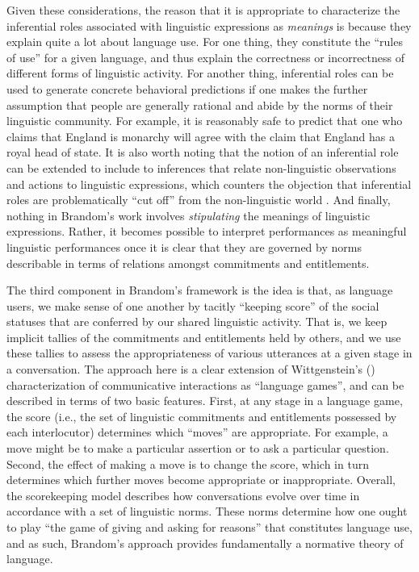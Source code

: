 Given these considerations, the reason that it is appropriate to characterize the inferential roles associated with linguistic expressions as \textit{meanings} is because they explain quite a lot about language use. For one thing, they constitute the ``rules of use'' for a given language, and thus explain the correctness or incorrectness of different forms of linguistic activity. For another thing, inferential roles can be used to generate concrete behavioral predictions if one makes the further assumption that people are generally rational and abide by the norms of their linguistic community. For example, it is reasonably safe to predict that one who claims that England is monarchy will agree with the claim that England has a royal head of state. It is also worth noting that the notion of an inferential role can be extended to include to inferences that relate non-linguistic observations and actions to linguistic expressions, which counters the objection that inferential roles are problematically ``cut off'' from the non-linguistic world \citep[see][pp. 199-271]{Brandom:1994}. And finally, nothing in Brandom's work involves \textit{stipulating} the meanings of linguistic expressions. Rather, it becomes possible to interpret performances as meaningful linguistic performances once it is clear that they are governed by norms describable in terms of relations amongst commitments and entitlements.

The third component in Brandom's framework is the idea is that, as language users, we make sense of one another by tacitly ``keeping score'' of the social statuses that are conferred by our shared linguistic activity. That is, we keep implicit tallies of the commitments and entitlements held by others, and we use these tallies to assess the appropriateness of various utterances at a given stage in a conversation. The approach here is a clear extension of Wittgenstein's (\citeyear{Wittgenstein:1953}) characterization of communicative interactions as ``language games'', and can be described in terms of two basic features. First, at any stage in a language game, the score (i.e., the set of linguistic commitments and entitlements possessed by each interlocutor) determines which ``moves'' are appropriate. For example, a move might be to make a particular assertion or to ask a particular question. Second, the effect of making a move is to change the score, which in turn determines which further moves become appropriate or inappropriate. Overall, the scorekeeping model describes how conversations evolve over time in accordance with a set of linguistic norms. These norms determine how one ought to play ``the game of giving and asking for reasons'' \citep[][p. 23]{Brandom:1994} that constitutes language use, and as such, Brandom's approach provides fundamentally a normative theory of language.

